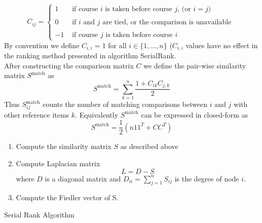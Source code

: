 \documentclass[10pt]{siamltex}
\newcounter{ale}
\begin{document}
\begin{pagewiselinenumbers}
\begin{equation}
C_{ij} = \left\{
	\begin{array}{rl}
 1 & \text{ if course $i$ is taken before course $j$, (or $i=j$)} 	\\
 &  \\
 0 & \text{ if $i$ and $j$ are tied, or the comparison is unavailable }	\\
 &  \\
 -1 & \text{ if course $j$ is taken before course $i$} 
     \end{array}
   \right.
\label{comparisonMatrix1}
\end{equation}
By convention we define $C_{i,i} = 1$ for all $i \in \{1, \dots, n\}$ ($C_{i,i}$ values have no effect in the
ranking method presented in algorithm SerialRank.\\
After constructing the comparison matrix $C$ we define the pair-wise similarity matrix $S^{\text{match}}$ as $$S^{\text{match}} = \sum_{k = 1}^{n} \frac{1+C_{ik}C_{j, k}}{2}$$
Thus $S^{\text{match}}_{ij}$ counts the number of matching comparisons between $i$ and $j$ with other reference
items $k$. Equivalently $S^{\text{match}}$ can be expressed in closed-form as $$S^{\text{match}} = \frac{1}{2}(n11^T + CC^T)$$
\begin{algorithm}[H]
\begin{enumerate}
\item Compute the similarity matrix $S$ as described above
\item Compute Laplacian matrix $$L = D - S$$ where $D$ is a diagonal matrix and $D_{ii} = \sum_{j = 1}^{n}S_{ij}$ is the degree of node $i$.
\item Compute the Fiedler vector of S.
\end{enumerate}
 \caption{Serial Rank Algorithm}
\end{algorithm}


\end{pagewiselinenumbers}
\end{document}
